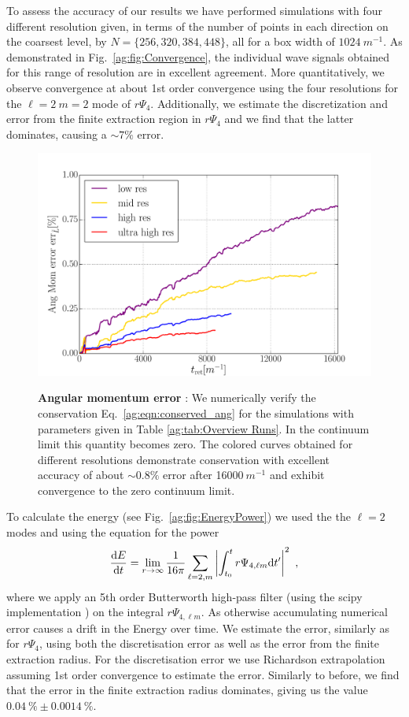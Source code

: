 To assess the accuracy of our results we have performed simulations with four different resolution given, in terms of the number of points in each direction on the coarsest level, by $N = \{256,320,384,448\}$, all for a box width 
of $1024~m^{-1}$. As demonstrated in Fig.~\ref{ag:fig:Convergence}, the individual wave signals obtained for this range of resolution are
in excellent agreement.
More quantitatively, we observe convergence at about 1st order convergence using the four resolutions for the $\ell = 2~m=2$ mode of $r\Psi_4$. Additionally, we estimate the discretization and error from the finite extraction region in $r\Psi_4$ and we find that the latter dominates, causing a $\sim 7\%$ error. 


\begin{figure}[h!]
\begin{center}
{\includegraphics[width=0.7\columnwidth]{ag_fig/ang_error_flux_with_radius_60.pdf}}
    \caption{{\bf Angular momentum error }: We numerically
    verify the conservation Eq.~\ref{ag:eqn:conserved_ang} for the simulations with parameters 
    given in Table \ref{ag:tab:Overview Runs}. In the continuum limit this
    quantity becomes zero. The colored curves
    obtained for different resolutions demonstrate
    conservation with excellent accuracy of
    about $\sim 0.8\%$ error after 16000$~m^{-1}$
    and exhibit convergence to the zero continuum limit.
    }
\label{ag:fig:ViolCons}
\end{center}
\end{figure}




To calculate the energy (see Fig.~\ref{ag:fig:EnergyPower}) we used the the $\ell = 2 $ modes and using the equation for the power
\begin{equation}\label{ag:eq:GWpower}
    \frac{{\rm d}E}{{\rm d}t} = \lim_{r\rightarrow \infty} \frac{1}{16 \pi} \sum_{\ell = 2, m} \left|\int_{t_0}^{t}  r\Psi_{4,\ell m}{\rm d}t^\prime \right|^2~,
\end{equation}
where we apply an 5th order Butterworth high-pass filter (using the scipy implementation \cite{jones_scipy_2001}) on the integral $r\Psi_{4,\ell m}$. As otherwise accumulating numerical error causes a  drift in the Energy over time. 
We estimate the error, similarly as for $r\Psi_4$, using both the discretisation error as well as the error from the finite extraction radius. For the discretisation error we use Richardson extrapolation assuming 1st order convergence to estimate the error. Similarly to before, we find that the error in the finite extraction radius dominates, giving us the value $ 0.04~\% \pm 0.0014~\% $. 

